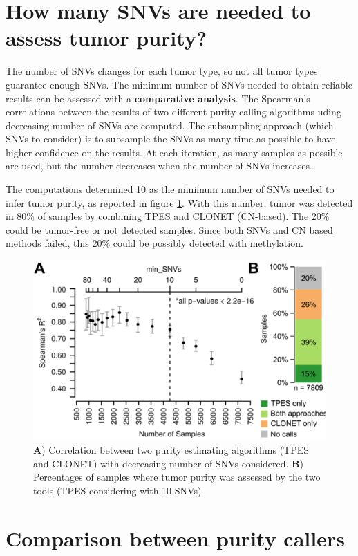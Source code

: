 \section{How many SNVs are needed to assess tumor purity?}

The number of SNVs changes for each tumor type, so not all tumor types guarantee enough SNVs. The minimum number of SNVs needed to obtain reliable results can be assessed with a \textbf{comparative analysis}. The Spearman's correlations between the results of two different purity calling algorithms uding decreasing number of SNVs are computed. The subsampling approach (which SNVs to consider) is to subsample the SNVs as many time as possible to have higher confidence on the results.
At each iteration, as many samples as possible are used, but the number decreases when the number of SNVs increases.

The computations determined 10 as the minimum number of SNVs needed to infer
tumor purity, as reported in figure \ref{fig:comp}. With this number, tumor was detected in 80\% of samples by
combining TPES and CLONET (CN-based). The 20\% could be tumor-free or not
detected samples. Since both SNVs and CN based methods failed, this 20\% could
be possibly detected with methylation.

\begin{figure}[H]
\centering
    \includegraphics[width=0.7\linewidth]{comparative.png}
    \caption{\textbf{A}) Correlation between two purity
    estimating algorithms (TPES and CLONET) with decreasing number of SNVs
    considered. \textbf{B}) Percentages of samples where tumor purity was
    assessed by the two tools (TPES considering with 10 SNVs)}
    \label{fig:comp}
\end{figure}


\section{Comparison between purity callers}

